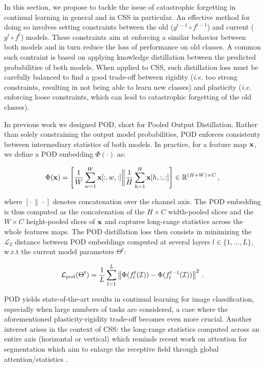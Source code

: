 In this section, we propose to tackle the issue of catastrophic forgetting in continual learning in
general and in CSS in particular. An effective method for doing so involves setting constraints
between the old ($g^{t-1} \circ f^{t-1}$) and current ($g^{t} \circ f^{t}$) models. These
constraints aim at enforcing a similar behavior between both models and in turn reduce the loss of
performance on old classes. A common such contraint is based on applying knowledge distillation
\citep{hinton2015knowledge_distillation,li2018lwf} between the predicted probabilities of both
models. When applied to CSS, such distillation loss must be carefully balanced to find a good
trade-off between rigidity (\textit{i.e.} too strong constraints, resulting in not being able to
learn new classes) and plasticity (\textit{i.e.} enforcing loose constraints, which can lead to
catastrophic forgetting of the old classes).


In previous work \citep{douillard2020podnet} we designed POD, short for Pooled Output Distillation.
Rather than solely constraining the output model probabilities, POD enforces consistenty between
intermediary statistics of both models. In practice, for a feature map $\mathbf{x}$, we define a POD
embedding $\Phi(\cdot)$ as:

\begin{equation}
    \Phi(\mathbf{x}) = \left[\frac{1}{W} \sum_{w=1}^W \mathbf{x}[:,w,:] \bigg\Vert \frac{1}{H} \sum_{h=1}^H \mathbf{x}[h,:,:]\right] \in \mathbb{R}^{(H + W) \times C}\,,
    \label{eq:pod_embedding}
\end{equation}

where $[\cdot\,\|\,\cdot]$ denotes concatenation over the channel axis. The POD embedding is thus
computed as the concatenation of the $H \times C$ width-pooled slices and the $W \times C$
height-pooled slices of $\mathbf{x}$ and captures long-range statistics across the whole features maps. The
POD distillation loss then consists in minimizing the $\mathcal{L}_2$ distance between POD
embeddings computed at several layers $l \in \{1, \dots, L\}$, w.r.t the current model parameters
$\Theta^t$:

\begin{equation}
    \mathcal{L}_\text{pod}(\Theta^t) = \frac{1}{L} \sum_{l = 1}^L \left\Vert  \Phi(f^t_l(\mathcal{I})) -  \Phi(f^{t-1}_l(\mathcal{I})) \right\Vert^2\,.
    \label{eq:pod_loss}
\end{equation}

POD yields state-of-the-art results in continual learning for image classification, especially when
large numbers of tasks are considered, a case where the aforementioned plasticity-rigidity trade-off
becomes even more crucial. Another interest arises in the context of CSS: the long-range statistics
computed across an entire axis (horizontal or vertical) which reminds recent work on attention for
segmentation \citep{wang2020axialdeeplab,huang2020ccnet,park2020csc} which aim to enlarge the
receptive field through global attention/statistics \citep{wang2020axialdeeplab}.

